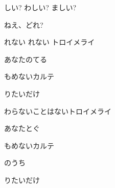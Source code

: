 \documentclass[14pt]{ltjsarticle}
\begin{document}
{  しい? わしい? ましい?
  \jisho{}

  
ねえ、どれ?
  \jisho{}

\item
  れない れない トロイメライ
  \jisho{}

  
あなたのてる
  \jisho{}

  もめないカルテ
  \jisho{}

   りたいだけ
  \jisho{}

\item
  わらないことはないトロイメライ
  \jisho{}

  
あなたとぐ
  \jisho{}

  もめないカルテ
  \jisho{}

    のうち
  \jisho{}

   りたいだけ
  \jisho{}

}
\end{document}
